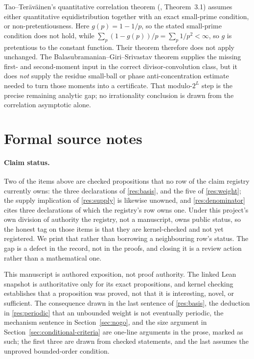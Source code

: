 \documentclass[11pt]{article}
\begin{document}
Tao--Ter\"av\"ainen's quantitative correlation theorem
(\cite{taoteravainen2025}, Theorem~3.1) assumes either quantitative
equidistribution together with an exact small-prime condition, or
non-pretentiousness.  Here $g(p)=1-1/p$, so the stated small-prime condition
does not hold, while
$\sum_p(1-g(p))/p=\sum_p1/p^2<\infty$, so $g$ is pretentious to the constant
function.  Their theorem therefore does not apply unchanged.  The
Balasubramanian--Giri--Srivastav theorem supplies the missing first- and
second-moment input in the correct divisor-convolution class, but it does
\emph{not} supply the residue small-ball or phase anti-concentration estimate
needed to turn those moments into a certificate.  That modulo-$2^L$ step is
the precise remaining analytic gap; no irrationality conclusion is drawn from
the correlation asymptotic alone.

\section*{Formal source notes}

\paragraph{Claim status.}
Two of the items above are checked propositions that no row of the claim
registry currently owns: the three declarations of \ref{res:basis}, and the
five of \ref{res:weight}; the supply implication of \ref{res:supply} is
likewise unowned, and \ref{res:denominator} cites three declarations of which
the registry's row owns one.  Under this project's own division of authority
the registry, not a manuscript, owns public status, so the honest tag on those
items is that they are kernel-checked and not yet registered.  We print that
rather than borrowing a neighbouring row's status.  The gap is a defect in the
record, not in the proofs, and closing it is a review action rather than a
mathematical one.

This manuscript is authored exposition, not proof authority.  The linked Lean
snapshot is authoritative only for its exact propositions, and kernel checking
establishes that a proposition was proved, not that it is interesting, novel,
or sufficient.  The consequence drawn in the last sentence of \ref{res:basis},
the deduction in \ref{res:periodic} that an unbounded weight is not eventually
periodic, the mechanism sentence in Section~\ref{sec:nogo}, and the size
argument in Section~\ref{sec:conditional-criteria} are one-line arguments in the prose,
marked as such; the first three are drawn from checked statements, and the
last assumes the unproved bounded-order condition.
\end{document}
